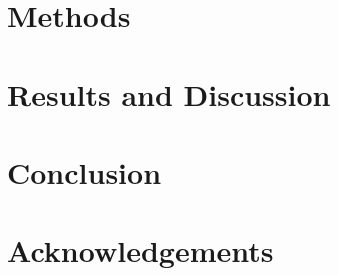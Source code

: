 \documentclass[12pt]{article}
\begin{document}
  \section{Methods}
  

  \section{Results and Discussion}
  

  \section{Conclusion}
  

  \section{Acknowledgements}
  
  
  \printbibliography[title=References]

\end{document}
